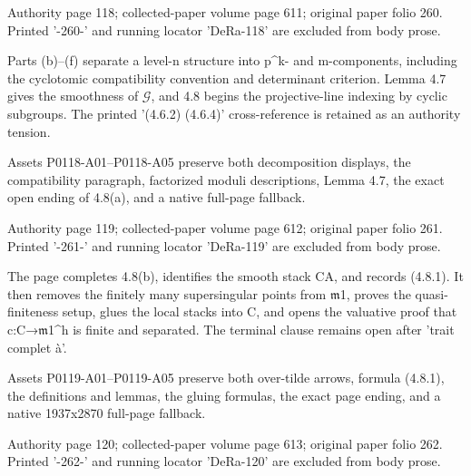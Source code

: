 \documentclass[11pt,a4paper]{article}
\begin{document}
\par\medskip
\hypertarget{D018-P0118}{}
\par\smallskip
Authority page 118; collected-paper volume page 611; original paper folio 260. Printed '-260-' and running locator 'DeRa-118' are excluded from body prose.

Parts (b)--(f) separate a level-n structure into p\textasciicircum{}k- and m-components, including the cyclotomic compatibility convention and determinant criterion. Lemma 4.7 gives the smoothness of \ensuremath{\mathcal{G}}, and 4.8 begins the projective-line indexing by cyclic subgroups. The printed '(4.6.2) (4.6.4)' cross-reference is retained as an authority tension.

Assets P0118-A01--P0118-A05 preserve both decomposition displays, the compatibility paragraph, factorized moduli descriptions, Lemma 4.7, the exact open ending of 4.8(a), and a native full-page fallback.


\par\medskip
\hypertarget{D018-P0119}{}
\par\smallskip
Authority page 119; collected-paper volume page 612; original paper folio 261. Printed '-261-' and running locator 'DeRa-119' are excluded from body prose.

The page completes 4.8(b), identifies the smooth stack C\textunderscore{}A, and records (4.8.1). It then removes the finitely many supersingular points from \ensuremath{\mathfrak{m}}\textunderscore{}1, proves the quasi-finiteness setup, glues the local stacks into C, and opens the valuative proof that c:C→\ensuremath{\mathfrak{m}}\textunderscore{}1\textasciicircum{}h is finite and separated. The terminal clause remains open after 'trait complet à'.

Assets P0119-A01--P0119-A05 preserve both over-tilde arrows, formula (4.8.1), the definitions and lemmas, the gluing formulas, the exact page ending, and a native 1937x2870 full-page fallback.


\par\medskip
\hypertarget{D018-P0120}{}
\par\smallskip
Authority page 120; collected-paper volume page 613; original paper folio 262. Printed '-262-' and running locator 'DeRa-120' are excluded from body prose.
\end{document}
